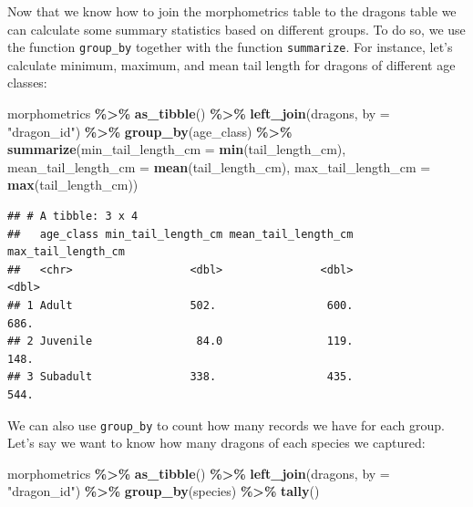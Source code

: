 \documentclass[
]{book}
\newenvironment{Shaded}{\begin{snugshade}}{\end{snugshade}}
\newcommand{\AttributeTok}[1]{\textcolor[rgb]{0.13,0.29,0.53}{#1}}
\newcommand{\FunctionTok}[1]{\textcolor[rgb]{0.13,0.29,0.53}{\textbf{#1}}}
\newcommand{\NormalTok}[1]{#1}
\newcommand{\SpecialCharTok}[1]{\textcolor[rgb]{0.81,0.36,0.00}{\textbf{#1}}}
\newcommand{\StringTok}[1]{\textcolor[rgb]{0.31,0.60,0.02}{#1}}
\begin{document}
Now that we know how to join the morphometrics table to the dragons table we can
calculate some summary statistics based on different groups. To do so, we use
the function \texttt{group\_by} together with the function \texttt{summarize}. For instance,
let's calculate minimum, maximum, and mean tail length for dragons of different
age classes:

\begin{Shaded}
\begin{Highlighting}[]
\NormalTok{morphometrics }\SpecialCharTok{\%\textgreater{}\%} 
  \FunctionTok{as\_tibble}\NormalTok{() }\SpecialCharTok{\%\textgreater{}\%} 
  \FunctionTok{left\_join}\NormalTok{(dragons, }\AttributeTok{by =} \StringTok{"dragon\_id"}\NormalTok{) }\SpecialCharTok{\%\textgreater{}\%}  
  \FunctionTok{group\_by}\NormalTok{(age\_class) }\SpecialCharTok{\%\textgreater{}\%} 
  \FunctionTok{summarize}\NormalTok{(}\AttributeTok{min\_tail\_length\_cm =} \FunctionTok{min}\NormalTok{(tail\_length\_cm),}
            \AttributeTok{mean\_tail\_length\_cm =} \FunctionTok{mean}\NormalTok{(tail\_length\_cm),}
            \AttributeTok{max\_tail\_length\_cm =} \FunctionTok{max}\NormalTok{(tail\_length\_cm))}
\end{Highlighting}
\end{Shaded}

\begin{verbatim}
## # A tibble: 3 x 4
##   age_class min_tail_length_cm mean_tail_length_cm max_tail_length_cm
##   <chr>                  <dbl>               <dbl>              <dbl>
## 1 Adult                  502.                 600.               686.
## 2 Juvenile                84.0                119.               148.
## 3 Subadult               338.                 435.               544.
\end{verbatim}

We can also use \texttt{group\_by} to count how many records we have for each group.
Let's say we want to know how many dragons of each species we captured:

\begin{Shaded}
\begin{Highlighting}[]
\NormalTok{morphometrics }\SpecialCharTok{\%\textgreater{}\%} 
  \FunctionTok{as\_tibble}\NormalTok{() }\SpecialCharTok{\%\textgreater{}\%} 
  \FunctionTok{left\_join}\NormalTok{(dragons, }\AttributeTok{by =} \StringTok{"dragon\_id"}\NormalTok{) }\SpecialCharTok{\%\textgreater{}\%}  
  \FunctionTok{group\_by}\NormalTok{(species) }\SpecialCharTok{\%\textgreater{}\%}
  \FunctionTok{tally}\NormalTok{()}
\end{Highlighting}
\end{Shaded}
\end{document}
